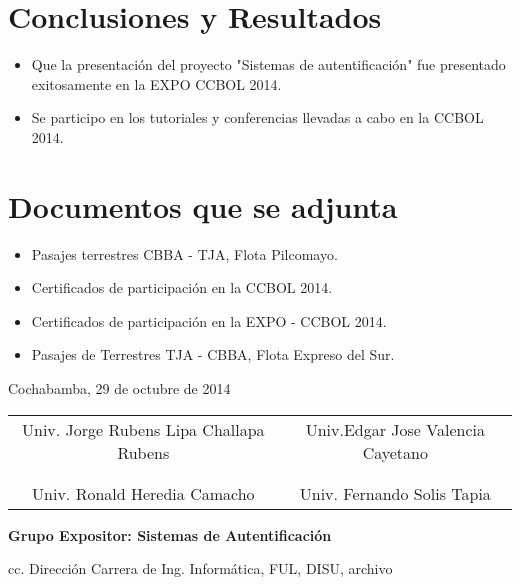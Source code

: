 \documentclass[letterpaper,12pt]{article}
\begin{document}
		\section{Conclusiones y Resultados}

		\begin{itemize}
		
			\item Que la presentaci\'on del proyecto "Sistemas de autentificaci\'on" fue presentado exitosamente en la EXPO CCBOL 2014. 
			\item Se participo en los tutoriales y conferencias llevadas a cabo en la CCBOL 2014.
		\end{itemize}
		
		\section{Documentos que se adjunta}
		
		\begin{itemize}
			\item Pasajes terrestres CBBA - TJA, Flota Pilcomayo.
			\item Certificados de participaci\'on en la CCBOL 2014.
			\item Certificados de participaci\'on en la EXPO - CCBOL 2014.
			\item Pasajes de Terrestres  TJA  - CBBA, Flota Expreso del Sur.
		\end{itemize}
		\vspace{.7cm}		
		\begin{center}
			Cochabamba, 29 de octubre de 2014
		\end{center}
		\vspace{1cm}
		\begin{center}
			\begin{tabular}{cc}
			Univ. Jorge Rubens Lipa Challapa Rubens & Univ.Edgar Jose Valencia Cayetano\\ 
			 &  \\
			 &  \\
			Univ. Ronald Heredia Camacho & Univ. Fernando Solis Tapia \\
		\end{tabular}				
		
		\end{center}
	
	\vspace{2cm}
	
	\begin{center}
		\textbf{Grupo Expositor: Sistemas de Autentificaci\'on}
	\end{center}
	
	cc. Direcci\'on Carrera de Ing. Inform\'atica, FUL, DISU, archivo
\end{document}
